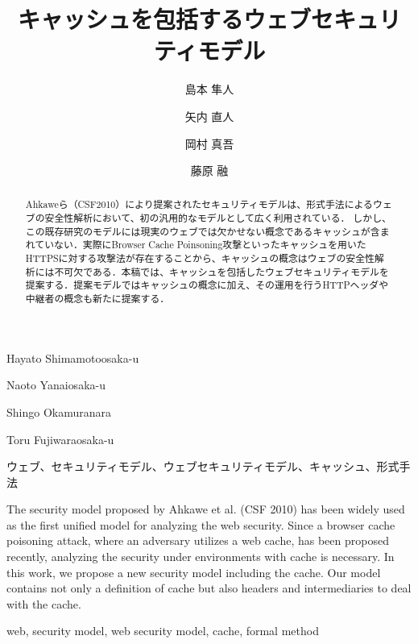 \documentclass{css}
\begin{document}
\title{キャッシュを包括するウェブセキュリティモデル}


\author{島本 隼人}{Hayato Shimamoto}{osaka-u}
\author{矢内 直人}{Naoto Yanai}{osaka-u}
\author{岡村 真吾}{Shingo Okamura}{nara}
\author{藤原 融}{Toru Fujiwara}{osaka-u}


\begin{abstract}
Ahkaweら（CSF2010）により提案されたセキュリティモデルは、形式手法によるウェブの安全性解析において、初の汎用的なモデルとして広く利用されている．
しかし、この既存研究のモデルには現実のウェブでは欠かせない概念であるキャッシュが含まれていない．実際にBrowser Cache Poinsoning攻撃といったキャッシュを用いたHTTPSに対する攻撃法が存在することから、キャッシュの概念はウェブの安全性解析には不可欠である．本稿では、キャッシュを包括したウェブセキュリティモデルを提案する．提案モデルではキャッシュの概念に加え、その運用を行うHTTPヘッダや中継者の概念も新たに提案する．
\end{abstract}

\begin{jkeyword}
ウェブ、セキュリティモデル、ウェブセキュリティモデル、キャッシュ、形式手法
\end{jkeyword}

\begin{eabstract}
The security model proposed by Ahkawe et al. (CSF 2010) has been widely used as the first unified model for analyzing the web security. Since a browser cache poisoning attack, where an adversary utilizes a web cache, has been proposed recently, analyzing the security under environments with cache is necessary. In this work, we propose a new security model including the cache. Our model contains not only a definition of cache but also headers and intermediaries to deal with the cache. 
\end{eabstract}

\begin{ekeyword}
web, security model, web security model, cache, formal method
\end{ekeyword}

\maketitle
\end{document}
